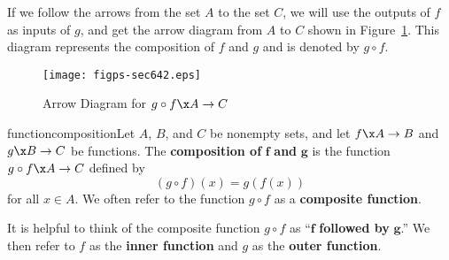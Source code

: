 If we follow the arrows from the set  $A$  to the set  $C$, we will use the outputs of  $f$  as inputs of  $g$, and get the arrow diagram from  $A$  to  $C$ shown in Figure~\ref{fig:arrow64-2}.  This diagram represents the composition of  $f$  and  $g$  and is denoted by  $g \circ f$\!.
\begin{figure}[h]
\begin{center}
\texttt{[image: figps-sec642.eps]} 
\caption{Arrow Diagram for $g \circ f\x  A \to C$} \label{fig:arrow64-2}
\end{center}
\end{figure}
%
\begin{defbox}{functioncomposition}{Let  $A$, $B$, and  $C$  be nonempty sets, and let  
$f\x A \to B$  and  $g\x B \to C$  be functions.  The \textbf{composition of}
%
%
  $\boldsymbol{f}$ \textbf{and} $\boldsymbol{g}$  is the function  $g \circ f\x A \to C$  defined by
\label{sym:composition}
\[
( {g \circ f} )( x ) = g\left( {f( x )} \right)
\]
for all  $x \in A$.  We often refer to the function  $g \circ f$ as a \textbf{composite function}.
%
%
}
\end{defbox} 
%
It is helpful to think of the composite function  $g \circ f$
 as  ``$\boldsymbol{f}$  \textbf{followed by}  $\boldsymbol{g}$.''  We then refer to  $f$  as the \textbf{inner function}
%
%
 and  $g$  as the \textbf{outer function}.
%
%


\endinput
